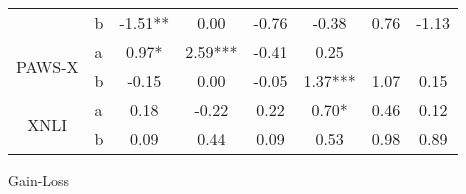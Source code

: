 {{\begin{tabular}{llc|c|c|c|c|c}
      \multicolumn{1}{c}{}                         & b  & \multicolumn{1}{c|}{\cellcolor{blue} -1.51**}       & \multicolumn{1}{c|}{\cellcolor{light-blue} 0.00}   & \multicolumn{1}{c|}{\cellcolor{blue} -0.76}         & \multicolumn{1}{c|}{\cellcolor{dark-blue} -0.38}     & \multicolumn{1}{c|}{\cellcolor{blue} 0.76}          & \multicolumn{1}{c}{\cellcolor{dark-blue} -1.13}   \\ \cline{3-8}
      \multicolumn{1}{c}{\multirow{2}{*}{PAWS-X}}  & a  & \multicolumn{1}{c|}{\cellcolor{blue} 0.97*}         & \multicolumn{1}{c|}{\cellcolor{dark-blue} 2.59***} & \multicolumn{1}{c|}{\cellcolor{blue} -0.41}         & \multicolumn{1}{c|}{\cellcolor{dark-blue} 0.25}      & \multicolumn{1}{c|}{}                               & \multicolumn{1}{c}{}                              \\
      \multicolumn{1}{c}{}                         & b  & \multicolumn{1}{c|}{\cellcolor{dark-blue} -0.15}    & \multicolumn{1}{c|}{\cellcolor{light-blue} 0.00}   & \multicolumn{1}{c|}{\cellcolor{dark-blue} -0.05}    & \multicolumn{1}{c|}{\cellcolor{dark-blue} 1.37***}   & \multicolumn{1}{c|}{\cellcolor{dark-blue} 1.07}     & \multicolumn{1}{c}{\cellcolor{dark-blue} 0.15}    \\ \cline{3-8}
      \multicolumn{1}{c}{\multirow{2}{*}{XNLI}}    & a  & \multicolumn{1}{c|}{\cellcolor{blue} 0.18}          & \multicolumn{1}{c|}{\cellcolor{blue} -0.22}        & \multicolumn{1}{c|}{\cellcolor{blue} 0.22}          & \multicolumn{1}{c|}{\cellcolor{blue} 0.70*}          & \multicolumn{1}{c|}{\cellcolor{dark-blue} 0.46}     & \multicolumn{1}{c}{\cellcolor{dark-blue} 0.12}    \\
      \multicolumn{1}{c}{}                         & b  & \multicolumn{1}{c|}{\cellcolor{blue} 0.09}          & \multicolumn{1}{c|}{\cellcolor{dark-blue} 0.44}    & \multicolumn{1}{c|}{\cellcolor{dark-blue} 0.09}     & \multicolumn{1}{c|}{\cellcolor{blue} 0.53}           & \multicolumn{1}{c|}{\cellcolor{blue} 0.98}          & \multicolumn{1}{c}{\cellcolor{dark-blue} 0.89}
      \end{tabular}
    }
  }{Gain-Loss}


